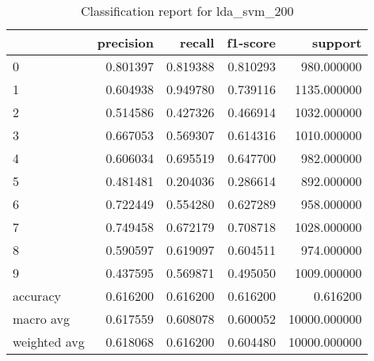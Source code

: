 \begin{table}[htb!]
\centering
\caption{Classification report for lda_svm_200}
\label{tab:classification-report-lda_svm_200}
\begin{tabular}{lrrrr}
\toprule
 & precision & recall & f1-score & support \\
\midrule
0 & 0.801397 & 0.819388 & 0.810293 & 980.000000 \\
1 & 0.604938 & 0.949780 & 0.739116 & 1135.000000 \\
2 & 0.514586 & 0.427326 & 0.466914 & 1032.000000 \\
3 & 0.667053 & 0.569307 & 0.614316 & 1010.000000 \\
4 & 0.606034 & 0.695519 & 0.647700 & 982.000000 \\
5 & 0.481481 & 0.204036 & 0.286614 & 892.000000 \\
6 & 0.722449 & 0.554280 & 0.627289 & 958.000000 \\
7 & 0.749458 & 0.672179 & 0.708718 & 1028.000000 \\
8 & 0.590597 & 0.619097 & 0.604511 & 974.000000 \\
9 & 0.437595 & 0.569871 & 0.495050 & 1009.000000 \\
accuracy & 0.616200 & 0.616200 & 0.616200 & 0.616200 \\
macro avg & 0.617559 & 0.608078 & 0.600052 & 10000.000000 \\
weighted avg & 0.618068 & 0.616200 & 0.604480 & 10000.000000 \\
\bottomrule
\end{tabular}
\end{table}
